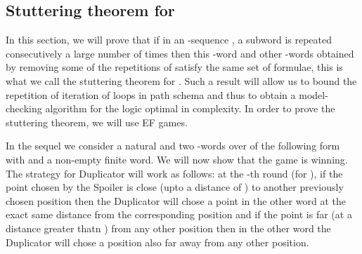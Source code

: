 \subsection{Stuttering theorem for }
In this section, we will prove that if in an -sequence , a subword  is repeated consecutively a large number of times then this -word and other -words obtained by removing some of the repetitions of  satisfy the same set of  formulae, this is what we call the stuttering theorem for . Such a result will allow us to bound the repetition of iteration of loops in path schema and thus to obtain a model-checking algorithm for the logic  optimal in complexity. In order to prove the stuttering theorem, we will use EF games.

In the sequel we consider a natural  and two -words over  of the following form  with  and  a non-empty finite word. We will now show that the game  is winning. The strategy for Duplicator will work as follows: at the -th round (for ), if the point chosen by the Spoiler is close (upto a distance of ) to another previously chosen position then the Duplicator will chose a point in the other word at the exact same distance from the corresponding position and if the point is far (at a distance greater thatn ) from any other position  then in the other word the Duplicator will chose a position also far away from any other position. 

